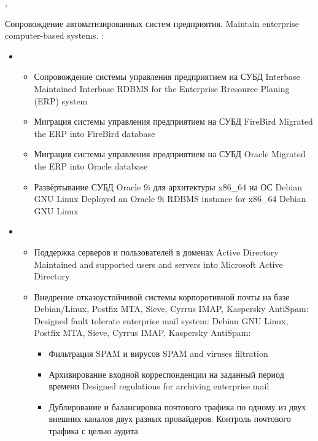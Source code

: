\documentclass[11pt,a4paper,sans]{moderncv}        %
\begin{document}
{\protect{}}
{\cityperm, \country}
{}
{
{Сопровождение автоматизированных систем предприятия.}
{Maintain enterprise computer-based systems.}\newline{}
\achievements:
\begin{itemize}
\item {}
	\begin{itemize}
	\item {}
		{Сопровождение системы управления предприятием на СУБД Interbase}
		{Maintained Interbase RDBMS for the Enterprise Rresource Planing (ERP) system}
	\item {}
		{Миграция системы управления предприятием на СУБД FireBird}
		{Migrated the ERP into FireBird database}
	\item {}
		{Миграция системы управления предприятием на СУБД Oracle}
		{Migrated the ERP into Oracle database}
	\item {}
		{Развёртывание СУБД Oracle 9i для архитектуры x86\_64 на ОС Debian GNU Linux}
		{Deployed an Oracle 9i RDBMS instance for x86\_64 Debian GNU Linux}
	\end{itemize}
\item {}
	\begin{itemize}
		\item {}
			{Поддержка серверов и пользователей в доменах Active Directory}
			{Maintained and supported users and servers into Microsoft Active Directory}
		\item {}
			{Внедрение отказоустойчивой системы корпоротивной почты на базе Debian/Linux, Postfix MTA, Sieve, Cyrrus IMAP, Kaspersky AntiSpam:}
			{Designed fault tolerate enterprise mail system: Debian GNU Linux, Postfix MTA, Sieve, Cyrrus IMAP, Kaspersky AntiSpam: }
			\begin{itemize}
			\item {}
				{Фильтрация SPAM и вирусов}
				{SPAM and viruses filtration}
			\item {}
				{Архивирование входной корреспонденции на заданный период времени}
				{Designed regulations for archiving enterprise mail}
			\item {}
				{Дублирование и балансировка почтового трафика по одному из двух внешних каналов двух разных провайдеров. Контроль почтового трафика с целью аудита}

\end{itemize}
\end{itemize}
\end{itemize}}
\end{document}
